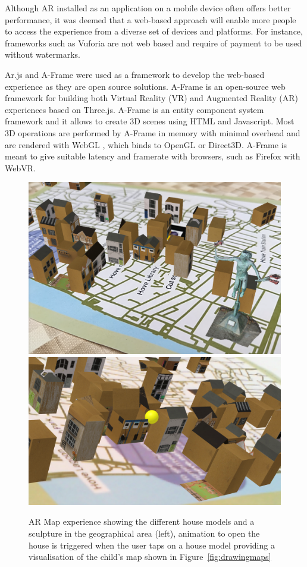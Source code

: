 \documentclass[acmlarge,screen,dvipsnames]{acmart}
\begin{document}
Although AR installed as an application on a mobile device often offers better
performance, it was deemed that a web-based approach will enable more people
to access the experience from a diverse set of devices and platforms. For
instance, frameworks such as Vuforia \cite{Vuforia} are not web based and
require of payment to be used without watermarks. 

Ar.js and A-Frame were used as a framework to develop the web-based experience
as they are open source solutions. A-Frame is an open-source web framework for
building both Virtual Reality (VR) and Augmented Reality (AR) experiences
based on Three.js. A-Frame is an entity component system framework and it
allows to create 3D scenes using HTML and Javascript. Most 3D operations are
performed by A-Frame in memory with minimal overhead and are rendered with
WebGL \cite{webgl}, which binds to OpenGL or Direct3D. A-Frame is meant to
give suitable latency and framerate with browsers, such as Firefox with WebVR.


\begin{figure}[ht] \centering
\includegraphics[width=0.6\linewidth]{images/ARcontentw_sculpture.png}
\includegraphics[width=0.6\linewidth]{images/animationARexperience_zoom.png}
\caption{AR Map experience showing the different house models and a sculpture in the geographical area (left),
 animation to open the house is triggered when the user taps on a house model providing a visualisation
 of the child's map shown in Figure~\ref{fig:drawingmaps}  } \label{fig:ARexperience}
\end{figure}
 
\end{document}
